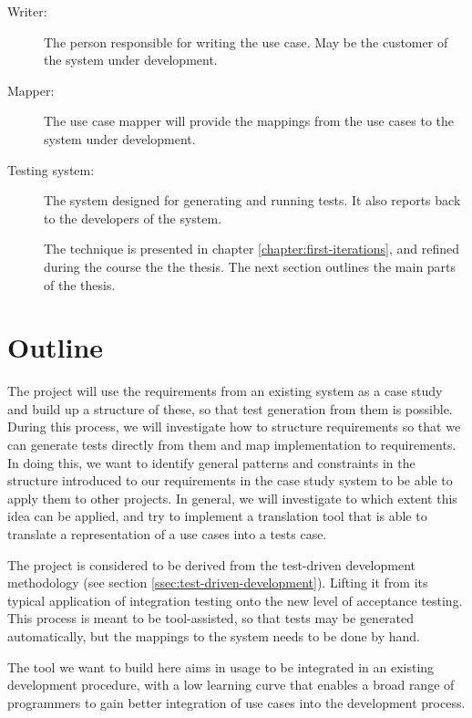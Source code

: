 \begin{description}

  \item[Writer:] The person responsible for writing the use case. May be the customer of the system under development.

  \item[Mapper:] The use case mapper will provide the mappings from the use cases to the system under development.

  \item[Testing system:] The system designed for generating and running tests. It also reports back to the developers of the system.

The technique is presented in chapter \ref{chapter:first-iterations}, and refined during the course the the thesis. The next section outlines the main parts of the thesis.

\end{description}

\section{Outline}
\noindent The project will use the requirements from an existing system as a case study and build up a structure of these, so that test generation from them is possible. During this process, we will investigate how to structure requirements so that we can generate tests directly from them and map implementation to requirements. In doing this, we want to identify general patterns and constraints in the structure introduced to our requirements in the case study system to be able to apply them to other projects. In general, we will investigate to which extent this idea can be applied, and try to implement a translation tool that is able to translate a representation of a use cases into a tests case.\medskip

\noindent The project is considered to be derived from the test-driven development methodology (see section \ref{ssec:test-driven-development}). Lifting it from its typical application of integration testing onto the new level of acceptance testing. This process is meant to be tool-assisted, so that tests may be generated automatically, but the mappings to the system needs to be done by hand.\medskip

\noindent The tool we want to build here aims in usage to be integrated in an existing development procedure, with a low learning curve that enables a broad range of programmers to gain better integration of use cases into the development process.\medskip

